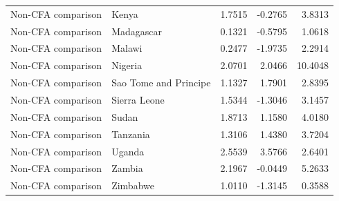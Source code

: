 \begin{table}
\begin{tabular}[t]{llrrr}
Non-CFA comparison & Kenya & 1.7515 & -0.2765 & 3.8313\\
\addlinespace
Non-CFA comparison & Madagascar & 0.1321 & -0.5795 & 1.0618\\
Non-CFA comparison & Malawi & 0.2477 & -1.9735 & 2.2914\\
Non-CFA comparison & Nigeria & 2.0701 & 2.0466 & 10.4048\\
Non-CFA comparison & Sao Tome and Principe & 1.1327 & 1.7901 & 2.8395\\
Non-CFA comparison & Sierra Leone & 1.5344 & -1.3046 & 3.1457\\
\addlinespace
Non-CFA comparison & Sudan & 1.8713 & 1.1580 & 4.0180\\
Non-CFA comparison & Tanzania & 1.3106 & 1.4380 & 3.7204\\
Non-CFA comparison & Uganda & 2.5539 & 3.5766 & 2.6401\\
Non-CFA comparison & Zambia & 2.1967 & -0.0449 & 5.2633\\
Non-CFA comparison & Zimbabwe & 1.0110 & -1.3145 & 0.3588\\
\bottomrule
\end{tabular}
\end{table}